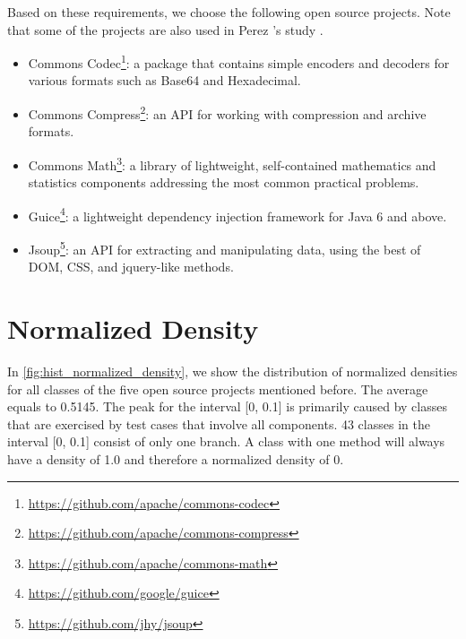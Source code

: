\documentclass[twoside,a4paper,11pt]{memoir}
\begin{document}
Based on these requirements, we choose the following open source projects.
Note that some of the projects are also used in Perez \etal's study \cite{DBLP:conf/icse/PerezAD17}.

\begin{itemize}[noitemsep]
    \item Commons Codec\footnote{\url{https://github.com/apache/commons-codec}}: a package that contains simple encoders and decoders for various formats such as Base64 and Hexadecimal.
    \item Commons Compress\footnote{\url{https://github.com/apache/commons-compress}}: an API for working with compression and archive formats.
    \item Commons Math\footnote{\url{https://github.com/apache/commons-math}}: a library of lightweight, self-contained mathematics and statistics components addressing the most common practical problems.
    \item Guice\footnote{\url{https://github.com/google/guice}}: a lightweight dependency injection framework for Java 6 and above.
    \item Jsoup\footnote{\url{https://github.com/jhy/jsoup}}: an API for extracting and manipulating data, using the best of DOM, CSS, and jquery-like methods.
\end{itemize}

\section{Normalized Density}

In \autoref{fig:hist_normalized_density}, we show the distribution of normalized densities for all classes of the five open source projects mentioned before.
The average equals to 0.5145.
The peak for the interval [0, 0.1] is primarily caused by classes that are exercised by test cases that involve all components.
43 classes in the interval [0, 0.1] consist of only one branch.
A class with one method will always have a density of 1.0 and therefore a normalized density of 0.
\end{document}
